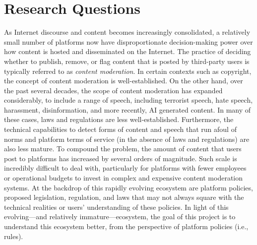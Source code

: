 \section{Research Questions}
\label{sec:questions}

As Internet discourse and content becomes increasingly consolidated, a
relatively small number of platforms now have disproportionate decision-making
power over how content is hosted and disseminated on the Internet. The
practice of deciding whether to publish, remove, or flag content that is
posted by third-party users is typically referred to as {\em content
moderation}.  In certain contexts such as copyright, the concept of content
moderation is well-established. On the other hand, over the past several
decades, the scope of content moderation has expanded considerably, to include
a range of speech, including terrorist speech, hate speech, harassment,
disinformation, and more recently, AI generated content.  In many of these
cases, laws and regulations are less well-established. Furthermore, the
technical capabilities to detect forms of content and speech that run afoul of
norms and platform terms of service (in the absence of laws and regulations)
are also less mature. To compound the problem, the amount of content that
users post to platforms has increased by several orders of magnitude.  Such
scale is incredibly difficult to deal with, particularly for platforms with
fewer employees or operational budgets to invest in complex and expensive
content moderation systems. At the backdrop of this rapidly evolving ecosystem
are platform policies, proposed legislation, regulation, and laws that may not
always square with the technical realities or users’ understanding of these
policies. In light of this evolving---and relatively immature---ecosystem, the
goal of this project is to understand this ecosystem better, from the
perspective of platform policies (i.e., rules). 

